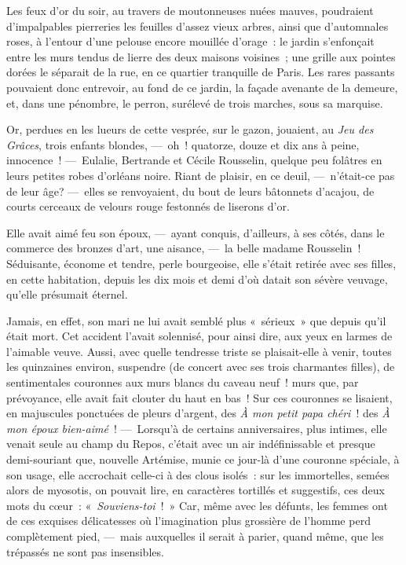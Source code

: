 \documentclass[french,twoside]{book} %
\newcommand{\bibl}[1]{{\RaggedLeft{#1}\par\bigskip}}
\begin{document}
\bibl{Stéphane {\scshape Mallarmé} (\emph{Entretiens}).}
\noindent Les feux d’or du soir, au travers de moutonneuses nuées mauves, poudraient d’impalpables pierreries les feuilles d’assez vieux arbres, ainsi que d’automnales roses, à l’entour d’une pelouse encore mouillée d’orage : le jardin s’enfonçait entre les murs tendus de lierre des deux maisons voisines ; une grille aux pointes dorées le séparait de la rue, en ce quartier tranquille de Paris. Les rares passants pouvaient donc entrevoir, au fond de ce jardin, la façade avenante de la demeure, et, dans une pénombre, le perron, surélevé de trois marches, sous sa marquise.\par
Or, perdues en les lueurs de cette vesprée,   sur le gazon, jouaient, au \emph{Jeu des Grâces}, trois enfants blondes, — oh ! quatorze, douze et dix ans à peine, innocence ! — Eulalie, Bertrande et Cécile Rousselin, quelque peu folâtres en leurs petites robes d’orléans noire. Riant de plaisir, en ce deuil, — n’était-ce pas de leur âge? — elles se renvoyaient, du bout de leurs bâtonnets d’acajou, de courts cerceaux de velours rouge festonnés de liserons d’or.\par
Elle avait aimé feu son époux, — ayant conquis, d’ailleurs, à ses côtés, dans le commerce des bronzes d’art, une aisance, — la belle madame Rousselin ! Séduisante, économe et tendre, perle bourgeoise, elle s’était retirée avec ses filles, en cette habitation, depuis les dix mois et demi d’où datait son sévère veuvage, qu’elle présumait éternel.\par
Jamais, en effet, son mari ne lui avait semblé plus « sérieux » que depuis qu’il était mort. Cet accident l’avait solennisé, pour ainsi dire, aux yeux en larmes de l’aimable veuve. Aussi, avec quelle tendresse triste se plaisait-elle à venir, toutes les quinzaines environ, suspendre (de   concert avec ses trois charmantes filles), de sentimentales couronnes aux murs blancs du caveau neuf ! murs que, par prévoyance, elle avait fait clouter du haut en bas ! Sur ces couronnes se lisaient, en majuscules ponctuées de pleurs d’argent, des \emph{À mon petit papa chéri} ! des \emph{À mon époux bien-aimé} ! — Lorsqu’à de certains anniversaires, plus intimes, elle venait seule au champ du Repos, c’était avec un air indéfinissable et presque demi-souriant que, nouvelle Artémise, munie ce jour-là d’une couronne spéciale, à son usage, elle accrochait celle-ci à des clous isolés : sur les immortelles, semées alors de myosotis, on pouvait lire, en caractères tortillés et suggestifs, ces deux mots du cœur : « \emph{Souviens-toi} ! » Car, même avec les défunts, les femmes ont de ces exquises délicatesses où l’imagination plus grossière de l’homme perd complètement pied, — mais auxquelles il serait à parier, quand même, que les trépassés ne sont pas insensibles.\par
\end{document}
